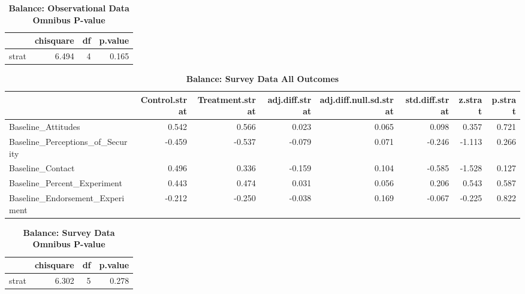 \documentclass[
]{article}
\begin{document}
\begin{table}[H]
\begin{center}
\label{tab:bal_obs_tab2}
\caption{\textbf{Balance: Observational Data Omnibus P-value}}
\smallskip

\begin{tabular}{l|r|r|r}
\hline
  & chisquare & df & p.value\\
\hline
strat & 6.494 & 4 & 0.165\\
\hline
\end{tabular}


\end{center}
\end{table}

\begin{table}[H]
\begin{center}
\label{tab:bal_svy_tab1}
\caption{\textbf{Balance: Survey Data All Outcomes}}
\smallskip

\begin{tabular}{l|r|r|r|r|r|r|r}
\hline
  & Control.strat & Treatment.strat & adj.diff.strat & adj.diff.null.sd.strat & std.diff.strat & z.strat & p.strat\\
\hline
Baseline\_Attitudes & 0.542 & 0.566 & 0.023 & 0.065 & 0.098 & 0.357 & 0.721\\
\hline
Baseline\_Perceptions\_of\_Security & -0.459 & -0.537 & -0.079 & 0.071 & -0.246 & -1.113 & 0.266\\
\hline
Baseline\_Contact & 0.496 & 0.336 & -0.159 & 0.104 & -0.585 & -1.528 & 0.127\\
\hline
Baseline\_Percent\_Experiment & 0.443 & 0.474 & 0.031 & 0.056 & 0.206 & 0.543 & 0.587\\
\hline
Baseline\_Endorsement\_Experiment & -0.212 & -0.250 & -0.038 & 0.169 & -0.067 & -0.225 & 0.822\\
\hline
\end{tabular}


\end{center}
\end{table}

\begin{table}[H]
\begin{center}
\label{tab:bal_svy_tab2}
\caption{\textbf{Balance: Survey Data Omnibus P-value}}
\smallskip

\begin{tabular}{l|r|r|r}
\hline
  & chisquare & df & p.value\\
\hline
strat & 6.302 & 5 & 0.278\\
\hline
\end{tabular}


\end{center}
\end{table}
\end{document}
